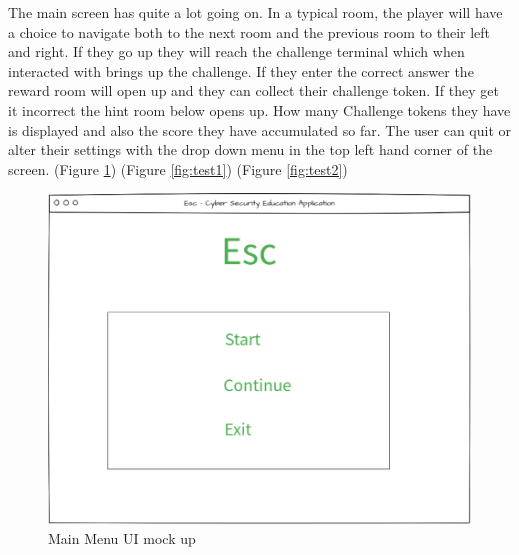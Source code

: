 \documentclass[12pt,a4paper]{article}
\begin{document}
The main screen has quite a lot going on. In a typical room, the player will have a choice to navigate both to the next room and the previous room to their left and right. If they go up they will reach the challenge terminal which when interacted with brings up the challenge. If they enter the correct answer the reward room will open up and they can collect their challenge token. If they get it incorrect the hint room below opens up. How many Challenge tokens they have is displayed and also the score they have accumulated so far. The user can quit or alter their settings with the drop down menu in the top left hand corner of the screen. (Figure \ref{Mainmenu}) (Figure \ref{fig:test1}) (Figure \ref{fig:test2})

\begin{figure}[h]
    \centering
    \includegraphics[width=1.0\textwidth]{Figs/Ui_main_menu.PNG} 
    \caption{Main Menu UI mock up} 
    \label{Mainmenu}
\end{figure}   
\end{document}
